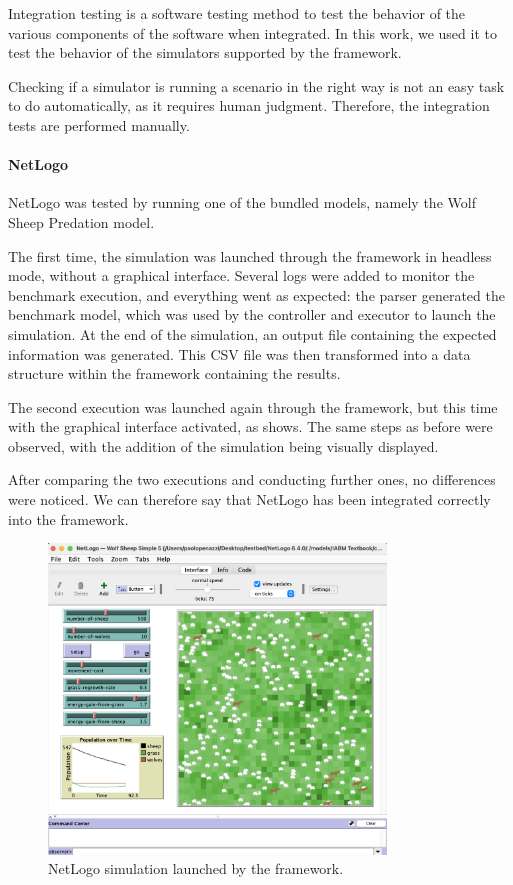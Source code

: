 \documentclass[12pt,a4paper,openright,twoside]{book}
\begin{document}
Integration testing is a software testing method to test the behavior of the various components of the software when integrated.
In this work, we used it to test the behavior of the simulators supported by the framework.

Checking if a simulator is running a scenario in the right way is not an easy task to do automatically, as it requires human judgment.
Therefore, the integration tests are performed manually.

\paragraph*{NetLogo}

NetLogo was tested by running one of the bundled models, namely the Wolf Sheep Predation model.

The first time, the simulation was launched through the framework in headless mode, without a graphical interface.
Several logs were added to monitor the benchmark execution, and everything went as expected:
the parser generated the benchmark model, which was used by the controller and executor to launch the simulation.
At the end of the simulation, an output file containing the expected information was generated.
This CSV file was then transformed into a data structure within the framework containing the results.

The second execution was launched again through the framework, but this time with the graphical interface activated, as  shows. 
The same steps as before were observed, with the addition of the simulation being visually displayed.

After comparing the two executions and conducting further ones, no differences were noticed. 
We can therefore say that NetLogo has been integrated correctly into the framework.

\begin{figure}[h!]
  \centering
  \includegraphics[width=0.8\textwidth]{figures/netlogo-sim.png}
  \caption{NetLogo simulation launched by the framework.}
  \label{fig:netlogo-sim}
\end{figure}
\end{document}
